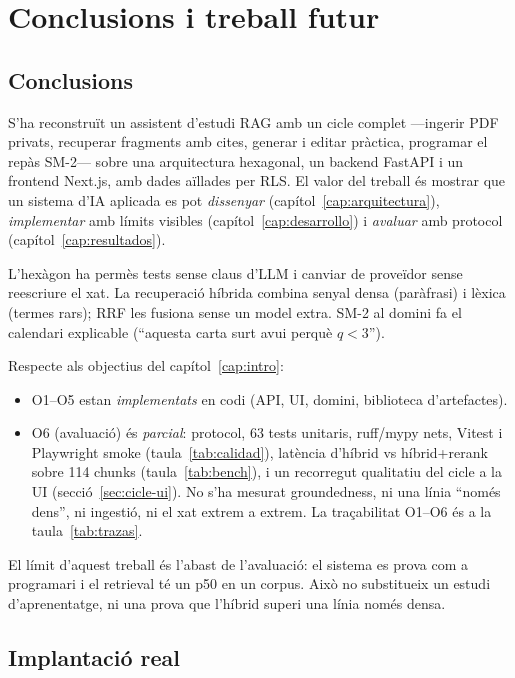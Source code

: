 \chapter{Conclusions i treball futur}
\label{cap:conclusiones}

\section{Conclusions}

S'ha reconstruït un assistent d'estudi RAG amb un cicle complet ---ingerir PDF privats, recuperar fragments amb cites, generar i editar pràctica, programar el repàs SM-2--- sobre una arquitectura hexagonal, un backend FastAPI i un frontend Next.js, amb dades aïllades per RLS. El valor del treball és mostrar que un sistema d'IA aplicada es pot \emph{dissenyar} (capítol~\ref{cap:arquitectura}), \emph{implementar} amb límits visibles (capítol~\ref{cap:desarrollo}) i \emph{avaluar} amb protocol (capítol~\ref{cap:resultados}).

L'hexàgon ha permès tests sense claus d'LLM i canviar de proveïdor sense reescriure el xat. La recuperació híbrida combina senyal densa (paràfrasi) i lèxica (termes rars); RRF les fusiona sense un model extra. SM-2 al domini fa el calendari explicable (``aquesta carta surt avui perquè $q<3$'').

Respecte als objectius del capítol~\ref{cap:intro}:

\begin{itemize}
  \item O1--O5 estan \emph{implementats} en codi (API, UI, domini, biblioteca d'artefactes).
  \item O6 (avaluació) és \emph{parcial}: protocol, 63 tests unitaris, ruff/mypy nets, Vitest i Playwright smoke (taula~\ref{tab:calidad}), latència d'híbrid vs híbrid+rerank sobre 114 chunks (taula~\ref{tab:bench}), i un recorregut qualitatiu del cicle a la UI (secció~\ref{sec:cicle-ui}). No s'ha mesurat groundedness, ni una línia ``només dens'', ni ingestió, ni el xat extrem a extrem. La traçabilitat O1--O6 és a la taula~\ref{tab:trazas}.
\end{itemize}

El límit d'aquest treball és l'abast de l'avaluació: el sistema es prova com a programari i el retrieval té un p50 en un corpus. Això no substitueix un estudi d'aprenentatge, ni una prova que l'híbrid superi una línia només densa.

\section{Implantació real}

